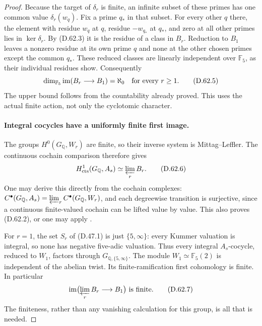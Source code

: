 \begin{proof}
Because the target of \(\delta_r\) is finite, an infinite
subset of these primes has one common value
\(\delta_r(w_q)\). Fix a prime \(q_*\) in that subset.
For every other \(q\) there, the element with residue
\(w_q\) at \(q\), residue \(-w_{q_*}\) at \(q_*\),
and zero at all other primes lies in \(\ker\delta_r\).
By (D.62.3) it is the residue of a class in \(B_r\).
Reduction to \(B_1\) leaves a nonzero residue at its
own prime \(q\) and none at the other chosen primes
except the common \(q_*\). These reduced classes are
linearly independent over \(\mathbb F_5\), as their
individual residues show. Consequently
\[
 \dim_{\mathbb F_5}\operatorname{im}(B_r\longrightarrow B_1)
                              =\aleph_0
                   \quad\hbox{for every }r\ge1.
                                                        \tag{D.62.5}
\]
The upper bound follows from the countability already
proved. This uses the actual finite action, not only
the cyclotomic character.

\paragraph{Integral cocycles have a uniformly finite first image.}
The groups \(H^0(G_{\mathbb Q},W_r)\) are finite, so
their inverse system is Mittag--Leffler. The continuous
cochain comparison therefore gives
\[
 H^1_{\mathrm{cts}}(G_{\mathbb Q},A_s)
                         \simeq\varprojlim_r B_r.
                                                        \tag{D.62.6}
\]
One may derive this directly from the cochain complexes:
\(C^\bullet(G_{\mathbb Q},A_s)=
\varprojlim_r C^\bullet(G_{\mathbb Q},W_r)\), and each
degreewise transition is surjective, since a continuous
finite-valued cochain can be lifted value by value.
This also proves (D.62.2), or one may apply
\cite[Proposition 1.6 and Theorem 2.2]{DE_Jannsen1988}.

For \(r=1\), the set \(S_r\) of (D.47.1) is just
\(\{5,\infty\}\): every Kummer valuation is integral,
so none has negative five-adic valuation. Thus every
integral \(A_s\)-cocycle, reduced to \(W_1\), factors
through \(G_{\mathbb Q,\{5,\infty\}}\). The module
\(W_1\simeq\mathbb F_5(2)\) is independent of the
abelian twist. Its finite-ramification first cohomology
is finite. In particular
\[
 \operatorname{im}\bigl(\varprojlim_r B_r\longrightarrow B_1\bigr)
                             \text{ is finite}.
                                                        \tag{D.62.7}
\]
The finiteness, rather than any vanishing calculation
for this group, is all that is needed.


\end{proof}
